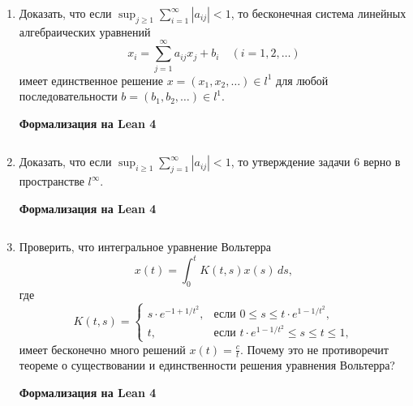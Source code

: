 \documentclass[12pt,a4paper]{article}
\begin{document}
\begin{enumerate}
\newpage
\item Доказать, что если $\sup_{j\ge1}\sum_{i=1}^{\infty}|a_{ij}|<1$, то бесконечная система линейных алгебраических уравнений
$$x_{i}=\sum_{j=1}^{\infty}a_{ij}x_{j}+b_{i} \quad (i=1,2,\dots)$$
имеет единственное решение $x=(x_{1},x_{2},\dots)\in l^{1}$ для любой последовательности $b=(b_{1},b_{2},\dots)\in l^{1}$.


\begin{center}\small\textbf{Формализация на Lean 4}\end{center}
\inputminted{lean}{FunAn/Section10_Contraction/Task06.lean}

\newpage
\item Доказать, что если $\sup_{i\ge1}\sum_{j=1}^{\infty}|a_{ij}|<1$, то утверждение задачи 6 верно в пространстве $l^{\infty}$.


\begin{center}\small\textbf{Формализация на Lean 4}\end{center}
\inputminted{lean}{FunAn/Section10_Contraction/Task07.lean}

\newpage
\item Проверить, что интегральное уравнение Вольтерра
$$x(t)=\int_{0}^{t}K(t,s)x(s) \, ds,$$
где
$$K(t,s)=
\begin{cases} s\cdot e^{-1+1/t^{2}}, & \text{если } 0\le s\le t\cdot e^{1-1/t^{2}}, \\ t, & \text{если } t\cdot e^{1-1/t^{2}}\le s\le t\le1,
\end{cases}$$
имеет бесконечно много решений $x(t)=\frac{c}{t}$. Почему это не противоречит теореме о существовании и единственности решения уравнения Вольтерра?


\begin{center}\small\textbf{Формализация на Lean 4}\end{center}
\newpage
\inputminted{lean}{FunAn/Section10_Contraction/Task08.lean}

\newpage


\end{enumerate}
\end{document}
